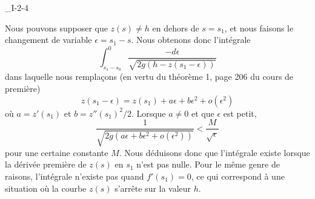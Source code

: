 \begin{corrige}{_I-2-4}

Nous pouvons supposer que $z(s)\neq h$ en dehors de $s=s_1$, et nous faisons le changement de variable $\epsilon=s_1-s$. Nous obtenons donc l'intégrale
\begin{equation}
	\int_{s_1-s_0}^0\frac{ -d\epsilon }{ \sqrt{ 2g(h-z(s_1-\epsilon)) } }
\end{equation}
dans laquelle nous remplaçons (en vertu du théorème 1, page 206 du cours de première)
\begin{equation}
	z(s_1-\epsilon)=z(s_1)+a\epsilon+b\epsilon^2+o(\epsilon^2)
\end{equation}
où $a=z'(s_1)$ et $b=z''(s_1)^2/2$. Lorsque $a\neq 0$ et que $\epsilon$ est petit,
\begin{equation}
	\frac{1}{ \sqrt{ 2g( a\epsilon+b\epsilon^2+o(\epsilon^2)  ) } }<\frac{ M }{ \sqrt{\epsilon} }
\end{equation}
pour une certaine constante $M$. Nous déduisons donc que l'intégrale existe lorsque la dérivée première de $z(s)$ en $s_1$ n'est pas nulle. Pour le même genre de raisons, l'intégrale n'existe pas quand $f'(s_1)=0$, ce qui correspond à une situation où la courbe $z(s)$ \og s'arrête\fg{} sur la valeur $h$.


\end{corrige}


